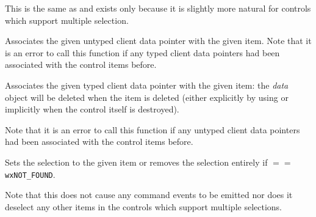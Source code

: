 \label{wxcontrolwithitemsselect}


This is the same as  and
exists only because it is slightly more natural for controls which support
multiple selection.


\label{wxcontrolwithitemssetclientdata}


Associates the given untyped client data pointer with the given item. Note that
it is an error to call this function if any typed client data pointers had been
associated with the control items before.





\label{wxcontrolwithitemssetclientobject}


Associates the given typed client data pointer with the given item: the
{\it data} object will be deleted when the item is deleted (either explicitly
by using  or implicitly when the
control itself is destroyed).

Note that it is an error to call this function if any untyped client data
pointers had been associated with the control items before.





\label{wxcontrolwithitemssetselection}


Sets the selection to the given item  or removes the selection entirely
if  $==$ {\tt wxNOT\_FOUND}.

Note that this does not cause any command events to be emitted nor does it
deselect any other items in the controls which support multiple selections.


